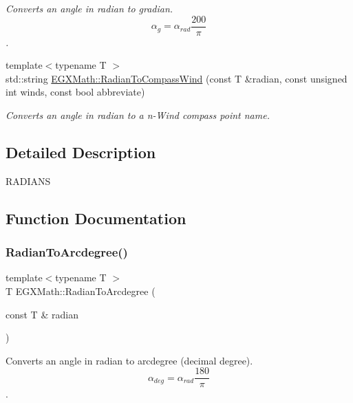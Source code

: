 \begin{DoxyCompactItemize}
\begin{DoxyCompactList}\small\item\em Converts an angle in radian to gradian. \[\alpha_{g}=\alpha_{rad}\frac{200}{\pi}\]. \end{DoxyCompactList}\item 
{\footnotesize template$<$typename T $>$ }\\std\+::string \mbox{\hyperlink{group___e_g_x_math-_angle_conversions-_radian_ga4d845b171148481aa7e85018d6dad035}{E\+G\+X\+Math\+::\+Radian\+To\+Compass\+Wind}} (const T \&radian, const unsigned int winds, const bool abbreviate)
\begin{DoxyCompactList}\small\item\em Converts an angle in radian to a n-\/\+Wind compass point name. \end{DoxyCompactList}\end{DoxyCompactItemize}


\subsection{Detailed Description}
R\+A\+D\+I\+A\+NS 

\subsection{Function Documentation}
\mbox{\label{group___e_g_x_math-_angle_conversions-_radian_ga3dfdc97357cc07f8379976bbc08f9852}} 
\subsubsection{\texorpdfstring{Radian\+To\+Arcdegree()}{RadianToArcdegree()}}
{\footnotesize\ttfamily template$<$typename T $>$ \\
T E\+G\+X\+Math\+::\+Radian\+To\+Arcdegree (\begin{DoxyParamCaption}\item[{const T \&}]{radian }\end{DoxyParamCaption})}



Converts an angle in radian to arcdegree (decimal degree). \[\alpha_{deg}=\alpha_{rad}\frac{180}{\pi}\]. 

